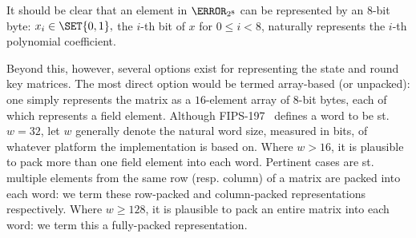 
It should be clear that an element in $\F_{2^8}$ can be represented by an
$8$-bit byte: 
$
x_i \in \SET{ 0, 1 } ,
$
the $i$-th bit of $x$ for $0 \leq i < 8$, naturally represents the $i$-th 
polynomial coefficient.

Beyond this, however, several options exist for representing the state and
round key matrices.  The most direct option would be termed
 array-based (or unpacked):
one simply represents the matrix as a $16$-element array of $8$-bit bytes, 
each of which represents a field element.
Although FIPS-197~\cite{FIPS:197} defines a word to be st. $w = 32$, let
$w$ generally denote the natural word size, measured in bits, of whatever
platform the implementation is based on.
Where $w >     16$,
it is plausible to pack
more than one field element 
into each word.  
Pertinent cases are st. multiple elements from the same row (resp. column) 
of a matrix are packed into each word:
we term these
   row-packed  
and
column-packed
representations respectively.
Where $w \geq 128$, 
it is plausible to pack
an entire matrix
into each word: 
we term this a 
 fully-packed 
representation.

